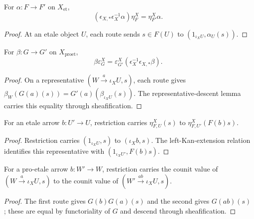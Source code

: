 
\begin{lemma}
\label{lemma:weil-efi-site-unit-naturality}
For $\alpha:F\to F'$ on $X_{\mathrm{et}}$,
\[
 (\epsilon_{X,*}\epsilon_X^{-1}\alpha)\eta^X_F
 =\eta^X_{F'}\alpha.
\]
\end{lemma}
\begin{proof}
At an etale object $U$, each route sends $s\in F(U)$ to
$(1_{\iota_XU},\alpha_U(s))$.
\end{proof}

\begin{lemma}
\label{lemma:weil-efi-site-counit-naturality}
For $\beta:G\to G'$ on $X_{\mathrm{proet}}$,
\[
 \beta\varepsilon^X_G
 =\varepsilon^X_{G'}(\epsilon_X^{-1}\epsilon_{X,*}\beta).
\]
\end{lemma}
\begin{proof}
On a representative $(W\xrightarrow a\iota_XU,s)$, each route gives
$\beta_W(G(a)(s))=G'(a)(\beta_{\iota_XU}(s))$.  The representative-descent
lemma carries this equality through sheafification.
\end{proof}

\begin{lemma}
\label{lemma:weil-efi-site-unit-restriction}
For an etale arrow $b:U'\to U$, restriction carries
$\eta^X_{F,U}(s)$ to $\eta^X_{F,U'}(F(b)s)$.
\end{lemma}
\begin{proof}
Restriction carries $(1_{\iota_XU},s)$ to $(\iota_Xb,s)$.  The
left-Kan-extension relation identifies this representative with
$(1_{\iota_XU'},F(b)s)$.
\end{proof}

\begin{lemma}
\label{lemma:weil-efi-site-counit-restriction}
For a pro-etale arrow $b:W'\to W$, restriction carries the counit value of
$(W\xrightarrow a\iota_XU,s)$ to the counit value of
$(W'\xrightarrow{ab}\iota_XU,s)$.
\end{lemma}
\begin{proof}
The first route gives $G(b)G(a)(s)$ and the second gives $G(ab)(s)$; these
are equal by functoriality of $G$ and descend through sheafification.
\end{proof}

